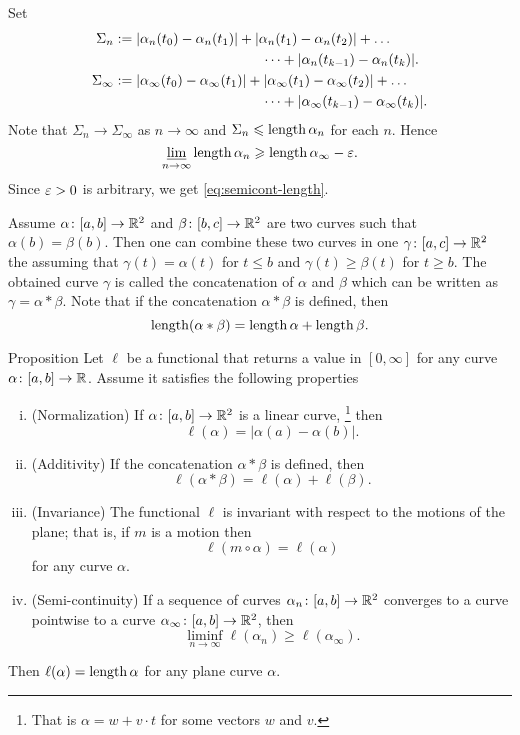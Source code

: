 Set 
\begin{align*}\Sigma_n
&\df
|\alpha_n(t_0)-\alpha_n(t_1)|+|\alpha_n(t_1)-\alpha_n(t_2)|+\dots
\\
&\ \ \ \ \ \ \ \ \ \ \ \ \ \ \ \ \ \ \ \ \ \ \ \ \ \ \ \ \ \ \ \ \dots+|\alpha_n(t_{k-1})-\alpha_n(t_k)|.
\\
\Sigma_\infty
&\df
|\alpha_\infty(t_0)-\alpha_\infty(t_1)|+|\alpha_\infty(t_1)-\alpha_\infty(t_2)|+\dots
\\
&\ \ \ \ \ \ \ \ \ \ \ \ \ \ \ \ \ \ \ \ \ \ \ \ \ \ \ \ \ \ \ \ \dots+|\alpha_\infty(t_{k-1})-\alpha_\infty(t_k)|.
\end{align*}
Note that $\Sigma_n\to \Sigma_\infty$ as $n\to\infty$
and $\Sigma_n\leqslant\mathop{\rm length}\nolimits\alpha_n$ for each $n$.
Hence
$$\varliminf_{n\to\infty} \mathop{\rm length}\nolimits\alpha_n \geqslant \mathop{\rm length}\nolimits\alpha_\infty-\varepsilon.$$
Since $\varepsilon>0$ is arbitrary, we get \ref{eq:semicont-length}.\qeds

Assume $\alpha\colon[a,b]\to \mathbb{R}^2$ and $\beta\colon[b,c]\to \mathbb{R}^2$ are two curves such that $\alpha(b)=\beta(b)$.
Then one can combine these two curves in one $\gamma\colon[a,c]\to \mathbb{R}^2$ the assuming that $\gamma(t)=\alpha(t)$ for $t\le b$ and $\gamma(t)\ge\beta(t)$ for $t\ge b$.
The obtained curve $\gamma$ is called the 
concatenation of $\alpha$ and $\beta$ which can be written as $\gamma=\alpha*\beta$.
Note that if the concatenation $\alpha*\beta$ is defined, then
\[\mathop{\rm length}\nolimits(\alpha*\beta)=\mathop{\rm length}\nolimits\alpha+\mathop{\rm length}\nolimits\beta.\]


\begin{thm}{Proposition}
Let $\ell$ be a functional that returns a value in $[0,\infty]$ for any curve $\alpha\colon[a,b]\to\mathbb{R}$.
Assume it satisfies the following properties
\begin{enumerate}[(i)]
\item\label{Normalization} (Normalization) If $\alpha\colon[a,b]\to \mathbb{R}^2$ is a linear curve,%
\footnote{That is $\alpha=w+v\cdot t$ for some vectors $w$ and $v$.} then
\[\ell(\alpha)=|\alpha(a)-\alpha(b)|.\]
\item\label{Additivity} (Additivity) If the concatenation $\alpha*\beta$ is defined, then
\[\ell(\alpha*\beta)=\ell(\alpha)+\ell(\beta).\]
\item\label{Invariance} (Invariance) The functional $\ell$ is invariant with respect to the motions of the plane; that is, if $m$ is a motion then 
\[\ell(m\circ\alpha)=\ell(\alpha)\]
for any curve $\alpha$.
\item\label{Semi-continuity} (Semi-continuity) If a sequence of curves $\alpha_n\colon[a,b]\to \mathbb{R}^2$ converges to a curve pointwise to a curve $\alpha_\infty\colon[a,b]\to \mathbb{R}^2$, then 
\[\liminf_{n\to\infty} \ell(\alpha_n) \ge \ell(\alpha_\infty).\]
\end{enumerate}
Then $\ell(\alpha)=\mathop{\rm length}\nolimits \alpha$ for any plane curve $\alpha$.

\end{thm}


